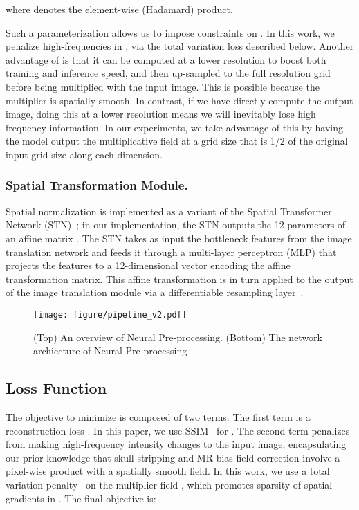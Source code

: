 \documentclass[runningheads]{llncs}
\begin{document}
where  denotes the element-wise (Hadamard) product. 

Such a parameterization allows us to impose constraints on . In this work, we penalize high-frequencies in , via the total variation loss described below.  
Another advantage of  is that it can be computed at a lower resolution to boost both training and inference speed, and then up-sampled to the full resolution grid before being multiplied with the input image. 
This is possible because the multiplier  is spatially smooth. 
In contrast, if we have  directly compute the output image, doing this at a lower resolution means we will inevitably lose high frequency information. 
In our experiments, we take advantage of this by having the model output the multiplicative field at a grid size that is 1/2 of the original input grid size along each dimension. 

\subsubsection{Spatial Transformation Module.}
Spatial normalization is implemented as a variant of the Spatial Transformer Network (STN)~\cite{jaderberg2015spatial}; in our implementation, the STN outputs the 12 parameters of an affine matrix . 
The STN takes as input the bottleneck features from the image translation network  and feeds it through a multi-layer perceptron (MLP) that projects the features to a 12-dimensional vector encoding the affine transformation matrix. This affine transformation is in turn applied to the output of the image translation module  via a differentiable resampling layer~\cite{jaderberg2015spatial}. 

\begin{figure}[t] 
\centering
\texttt{[image: figure/pipeline\_v2.pdf]} 
\caption{(Top) An overview of Neural Pre-processing. (Bottom) The network archiecture of Neural Pre-processing} \label{fig_p}
\end{figure}

\subsection{Loss Function}
\label{sec:loss}
The objective to minimize is composed of two terms.
The first term is a reconstruction loss . In this paper, we use SSIM~\cite{Wang2004} for .
The second term penalizes  from making high-frequency intensity changes to the input image, encapsulating our prior knowledge that skull-stripping and MR bias field correction involve a pixel-wise product with a spatially smooth field.
In this work, we use a total variation penalty~\cite{Osher2005}  on the multiplier field , which promotes sparsity of spatial gradients in . The final objective is:
\end{document}
